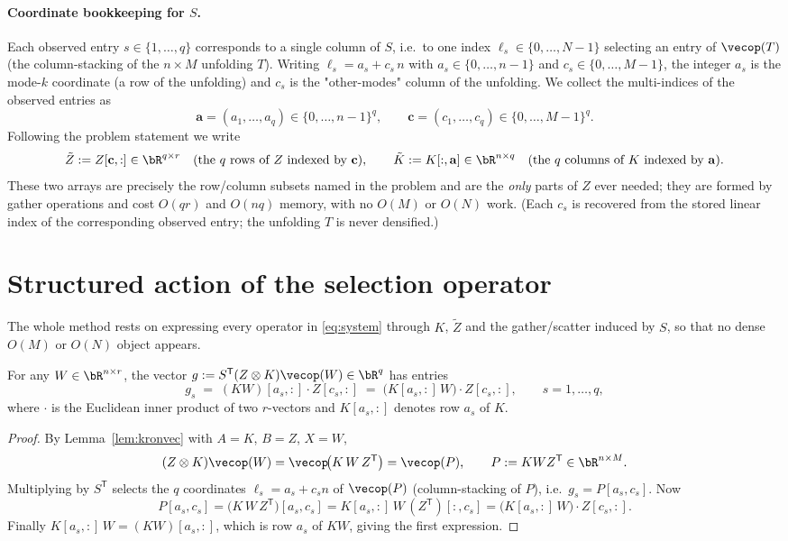 \paragraph{Coordinate bookkeeping for $S$.}
Each observed entry $s\in\{1,\dots,q\}$ corresponds to a single column of $S$, i.e.\
to one index $\ell_s\in\{0,\dots,N-1\}$ selecting an entry of $\vecop(T)$ (the
column-stacking of the $n\times M$ unfolding $T$). Writing $\ell_s=a_s+c_s\,n$ with
$a_s\in\{0,\dots,n-1\}$ and $c_s\in\{0,\dots,M-1\}$, the integer $a_s$ is the
mode-$k$ coordinate (a row of the unfolding) and $c_s$ is the "other-modes" column
of the unfolding. We collect the multi-indices of the observed entries as
\[
  \mathbf a=(a_1,\dots,a_q)\in\{0,\dots,n-1\}^q,
  \qquad
  \mathbf c=(c_1,\dots,c_q)\in\{0,\dots,M-1\}^q .
\]
Following the problem statement we write
\[
  \tilde Z := Z[\mathbf c,:]\in\bR^{q\times r}
  \quad(\text{the $q$ rows of $Z$ indexed by }\mathbf c),
  \qquad
  \tilde K := K[:,\mathbf a]\in\bR^{n\times q}
  \quad(\text{the $q$ columns of $K$ indexed by }\mathbf a).
\]
These two arrays are precisely the row/column subsets named in the problem and are the
\emph{only} parts of $Z$ ever needed; they are formed by gather operations and cost
$O(qr)$ and $O(nq)$ memory, with no $O(M)$ or $O(N)$ work. (Each $c_s$ is recovered
from the stored linear index of the corresponding observed entry; the unfolding $T$ is
never densified.)

\section{Structured action of the selection operator}

The whole method rests on expressing every operator in \eqref{eq:system} through $K$,
$\tilde Z$ and the gather/scatter induced by $S$, so that no dense $O(M)$ or $O(N)$
object appears.

\begin{lemma}\label{lem:forward}
For any $W\in\bR^{n\times r}$, the vector $g:=S^{\mathsf T}(Z\otimes K)\vecop(W)\in\bR^q$
has entries
\begin{equation}\label{eq:forward}
  g_s \;=\; (KW)[a_s,:]\cdot Z[c_s,:]
      \;=\; \big(K[a_s,:]\,W\big)\cdot Z[c_s,:],
  \qquad s=1,\dots,q,
\end{equation}
where $\cdot$ is the Euclidean inner product of two $r$-vectors and $K[a_s,:]$ denotes
row $a_s$ of $K$.
\end{lemma}
\begin{proof}
By Lemma~\ref{lem:kronvec} with $A=K$, $B=Z$, $X=W$,
\[
  (Z\otimes K)\vecop(W)=\vecop\!\big(K\,W\,Z^{\mathsf T}\big)
  =\vecop(P),\qquad P:=KWZ^{\mathsf T}\in\bR^{n\times M}.
\]
Multiplying by $S^{\mathsf T}$ selects the $q$ coordinates $\ell_s=a_s+c_s n$ of
$\vecop(P)$ (column-stacking of $P$), i.e.\ $g_s=P[a_s,c_s]$. Now
\[
  P[a_s,c_s]=\big(K\,W\,Z^{\mathsf T}\big)[a_s,c_s]
           =K[a_s,:]\,W\,(Z^{\mathsf T})[:,c_s]
           =\big(K[a_s,:]\,W\big)\cdot Z[c_s,:].
\]
Finally $K[a_s,:]\,W=(KW)[a_s,:]$, which is row $a_s$ of $KW$, giving the first
expression.
\end{proof}

